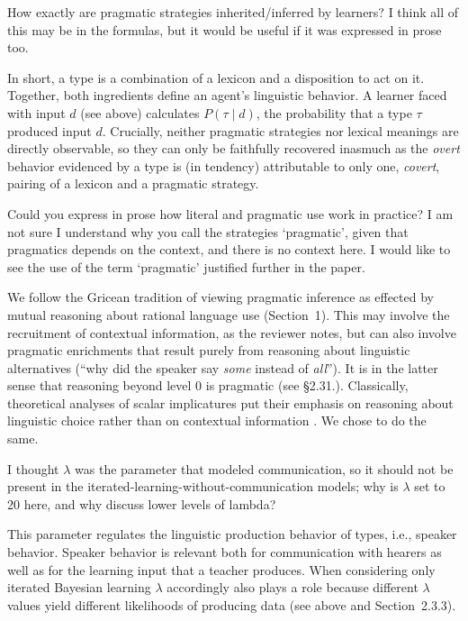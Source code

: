 \documentclass[12pt,a4paper]{article}
\begin{document}
\vspace{.5cm}
\begin{mdframed}[backgroundcolor=gray!25,linecolor=gray!25]
How exactly are pragmatic strategies inherited/inferred by learners?    I think all of this may be in the formulas, but it would be useful if it was expressed in prose too.
\end{mdframed}
In short, a type is a combination of a lexicon and a disposition to act on it. Together, both ingredients define an agent's linguistic behavior. A learner faced with input $d$ (see above) calculates $P(\tau \mid d)$, the probability that a type $\tau$ produced input $d$. Crucially, neither pragmatic strategies nor lexical meanings are directly observable, so they can only be faithfully recovered inasmuch as the {\em overt} behavior evidenced by a type is (in tendency) attributable to only one, {\em covert}, pairing of a lexicon and a pragmatic strategy.

\vspace{.5cm}
\begin{mdframed}[backgroundcolor=gray!25,linecolor=gray!25]
Could you express in prose how literal and pragmatic use work in practice? I am not sure I understand why you call the strategies `pragmatic', given that pragmatics depends on the context, and there is no context here. I would like to see the use of the term `pragmatic' justified further in the paper.
\end{mdframed}
We follow the Gricean tradition of viewing pragmatic inference as effected by mutual reasoning about rational language use (Section~1). This may involve the recruitment of contextual information, as the reviewer notes, but can also involve pragmatic enrichments that result purely from reasoning about linguistic alternatives (``why did the speaker say {\em some} instead of {\em all}''). It is in the latter sense that reasoning beyond level $0$ is pragmatic (see \S2.31.). Classically, theoretical analyses of scalar implicatures put their emphasis on reasoning about linguistic choice rather than on contextual information \citep[e.g.,][]{horn:1972,gazdar:1979, franke:2009, GoodmanStuhlmuller2013:Knowledge-and-I}. We chose to do the same.

\vspace{.5cm}
\begin{mdframed}[backgroundcolor=gray!25,linecolor=gray!25]
I thought $\lambda$ was the parameter that modeled communication, so it should not be present in the iterated-learning-without-communication models; why is $\lambda$ set to 20 here, and why discuss lower levels of lambda? 
\end{mdframed}
This parameter regulates the linguistic production behavior of types, i.e., speaker behavior. Speaker behavior is relevant both for communication with hearers as well as for the learning input that a teacher produces. When considering only iterated Bayesian learning $\lambda$ accordingly also plays a role because different $\lambda$ values yield different likelihoods of producing data (see above and Section~2.3.3). 
\end{document}
